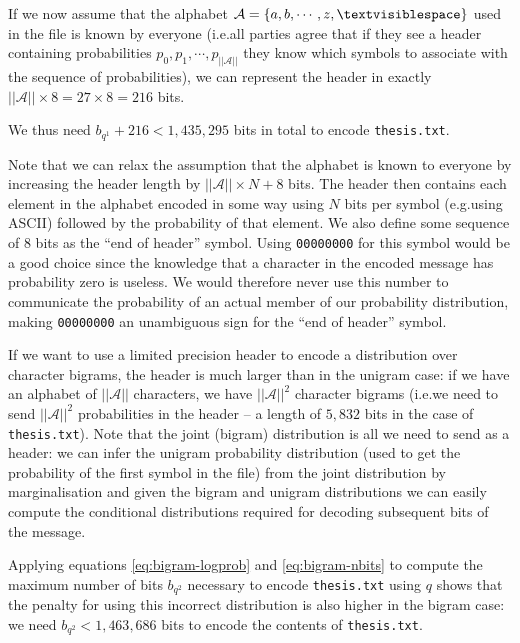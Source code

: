 \documentclass[10pt,a4paper,oneside,onecolumn]{article}
\makeatletter
\newcommand*{\thesisTXT}{{\tt thesis.txt}\xspace}
\newcommand*{\eg}{e.g.\@}
\newcommand*{\ie}{i.e.\@}
\newcommand*{\norm}[1]{\ensuremath{\left|\left|#1\right|\right|}}
\newcommand*{\lbr}{\ensuremath{\left\{}}
\newcommand*{\rbr}{\ensuremath{\right\}}}
\makeatother
\begin{document}
If we now assume that the alphabet $\mathcal{A} = \lbr a, b, \cdots, z,
\textvisiblespace \rbr$ used in the file is known by everyone (\ie all parties
agree that if they see a header containing probabilities $p_0, p_1, \cdots,
p_{\norm{\mathcal{A}}}$ they know which symbols to associate with the sequence
of probabilities), we can represent the header in exactly $\norm{\mathcal{A}}
\times 8 = 27 \times 8 = 216$ bits.\footnotemark

We thus need $b_{q^1} + 216 < 1,435,295$ bits in total to encode \thesisTXT.


Note that we can relax the assumption that the alphabet is known to everyone by
increasing the header length by $\norm{\mathcal{A}} \times N + 8$ bits. The
header then contains each element in the alphabet encoded in some way using $N$
bits per symbol (\eg using ASCII) followed by the probability of that element.
We also define some sequence of 8 bits as the ``end of header'' symbol. Using
{\tt 00000000} for this symbol would be a good choice since the knowledge that a
character in the encoded message has probability zero is useless. We would
therefore never use this number to communicate the probability of an actual
member of our probability distribution, making {\tt 00000000} an unambiguous
sign for the ``end of header'' symbol.

If we want to use a limited precision header to encode a distribution over
character bigrams, the header is much larger than in the unigram case: if we
have an alphabet of $\norm{\mathcal{A}}$ characters, we have
$\norm{\mathcal{A}}^2$ character bigrams (\ie we need to send
$\norm{\mathcal{A}}^2$ probabilities in the header -- a length of $5,832$
bits in the case of \thesisTXT). Note that the joint (bigram) distribution is
all we need to send as a header: we can infer the unigram probability
distribution (used to get the probability of the first symbol in the file) from
the joint distribution by marginalisation and given the bigram and unigram
distributions we can easily compute the conditional distributions required for
decoding subsequent bits of the message.

Applying equations \eqref{eq:bigram-logprob} and \eqref{eq:bigram-nbits} to
compute the maximum number of bits $b_{q^2}$ necessary to encode \thesisTXT
using $q$ shows that the penalty for using this incorrect distribution is also
higher in the bigram case: we need $b_{q^2} < 1,463,686$ bits to encode the
contents of \thesisTXT\@.
\end{document}
